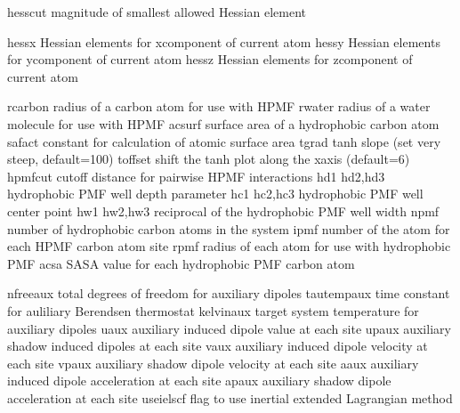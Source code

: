\documentclass[letterpaper,11pt,english]{sphinxmanual}
\begin{document}

\begin{sphinxVerbatim}[commandchars=\\\{\}]
hesscut         magnitude of smallest allowed Hessian element
\end{sphinxVerbatim}


\begin{sphinxVerbatim}[commandchars=\\\{\}]
hessx           Hessian elements for x\PYGZhy{}component of current atom
hessy           Hessian elements for y\PYGZhy{}component of current atom
hessz           Hessian elements for z\PYGZhy{}component of current atom
\end{sphinxVerbatim}


\begin{sphinxVerbatim}[commandchars=\\\{\}]
rcarbon         radius of a carbon atom for use with HPMF
rwater          radius of a water molecule for use with HPMF
acsurf          surface area of a hydrophobic carbon atom
safact          constant for calculation of atomic surface area
tgrad           tanh slope (set very steep, default=100)
toffset         shift the tanh plot along the x\PYGZhy{}axis (default=6)
hpmfcut         cutoff distance for pairwise HPMF interactions
hd1             hd2,hd3  hydrophobic PMF well depth parameter
hc1             hc2,hc3  hydrophobic PMF well center point
hw1             hw2,hw3  reciprocal of the hydrophobic PMF well width
npmf            number of hydrophobic carbon atoms in the system
ipmf            number of the atom for each HPMF carbon atom site
rpmf            radius of each atom for use with hydrophobic PMF
acsa            SASA value for each hydrophobic PMF carbon atom
\end{sphinxVerbatim}


\begin{sphinxVerbatim}[commandchars=\\\{\}]
nfree\PYGZus{}aux       total degrees of freedom for auxiliary dipoles
tautemp\PYGZus{}aux     time constant for auliliary Berendsen thermostat
kelvin\PYGZus{}aux      target system temperature for auxiliary dipoles
uaux            auxiliary induced dipole value at each site
upaux           auxiliary shadow induced dipoles at each site
vaux            auxiliary induced dipole velocity at each site
vpaux           auxiliary shadow dipole velocity at each site
aaux            auxiliary induced dipole acceleration at each site
apaux           auxiliary shadow dipole acceleration at each site
use\PYGZus{}ielscf      flag to use inertial extended Lagrangian method
\end{sphinxVerbatim}
\end{document}
